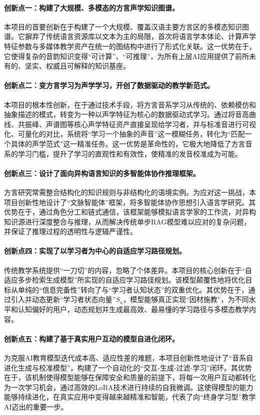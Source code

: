 \paragraph{创新点一：构建了大规模、多模态的方言声学知识图谱。}
本项目的首要创新在于构建了一个大规模、覆盖汉语主要方言区的多模态知识图谱。它摒弃了传统语言资源库以文本为主的局限，首次将语言学本体论、计算声学特征参数与多媒体教学资产在统一的图结构中进行了形式化关联。这一优势在于，它使得复杂的音韵知识变得“可计算”、“可推理”，为所有上层AI应用提供了前所未有的、坚实、权威且可解释的知识基座。

\paragraph{创新点二：变方言学习为声学学习，开创了数据驱动的教学新范式。}
本项目的根本性创新，在于通过技术手段，将方言音系学习从传统的、依赖模仿和抽象描述的模式，转变为一种以声学特征为核心的数据驱动式学习。通过将音高曲线、共振峰、声谱图等核心声学特征资产直接呈现给学习者，并与标准音进行可视化、可量化的对比，系统将“学习一个抽象的声音”这一模糊任务，转化为“匹配一个具体的声学范式”这一精准任务。这一优势是革命性的，它极大地降低了方言音系的学习门槛，提升了学习的直观性和有效性，使精准的发音校准成为可能。

\paragraph{创新点三：设计了面向异构语言知识的多智能体协作推理框架。}
方言研究常需整合结构化的知识规则与非结构化的语境实例。为应对这一挑战，本项目创新性地设计了“文脉智能体”框架，将多智能体协作思想引入语言学研究。其优势在于，通过角色分工和链式通信，该框架能够模拟语言学家的工作流，对异构知识源进行深度整合与推理，从而解决传统单步RAG模型难以应对的复杂问题，并保证了推理过程的透明性与逻辑严谨性。

\paragraph{创新点四：实现了以学习者为中心的自适应学习路径规划。}
传统教学系统提供“一刀切”的内容，忽略了个体差异。本项目的核心创新在于“自适应多步检索生成模型”所实现的自适应学习路径规划。该模型颠覆性地将优化目标从单纯的“信息完备性”转向了与“学习者认知状态”的双重优化。其优势在于，通过引入并动态更新“学习者状态向量”$S_u$，模型能够真正实现“因材施教”，为不同水平和认知偏好的用户，动态规划并生成最高效、最易懂的学习路径与多模态教学内容。

\paragraph{创新点五：构建了基于真实用户互动的模型自进化闭环。}
为克服AI教育模型迭代成本高、适应性差的难题，本项目创新性地设计了“音系自进化生成与校准模型”，构建了一个自动化的“交互-生成-过滤-学习”闭环。其优势在于，该机制使得模型能够在保障安全和质量的前提下，将每一次用户互动都转化为一次学习机会，通过高效的LoRA技术进行持续的自我微调。这使得模型的能力能够持续进化，在真实应用中变得越来越精准和智能，代表了向“终身学习型”教学AI迈出的重要一步。

